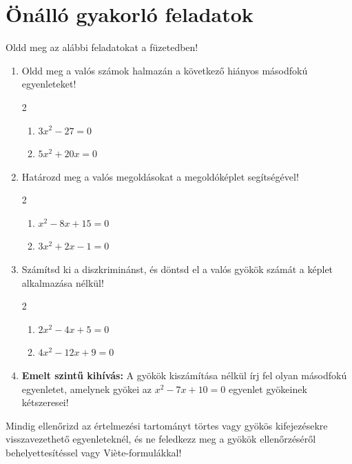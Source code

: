 \documentclass[11pt,a4paper]{article}
\begin{document}
\section{Önálló gyakorló feladatok}

Oldd meg az alábbi feladatokat a füzetedben!

\begin{enumerate}[label=\textbf{\arabic*.}]
    \item Oldd meg a valós számok halmazán a következő hiányos másodfokú egyenleteket!
    \begin{multicols}{2}
        \begin{enumerate}[label=\alph*)]
            \item $3x^2 - 27 = 0$
            \item $5x^2 + 20x = 0$
        \end{enumerate}
    \end{multicols}

    \item Határozd meg a valós megoldásokat a megoldóképlet segítségével!
    \begin{multicols}{2}
        \begin{enumerate}[label=\alph*)]
            \item $x^2 - 8x + 15 = 0$
            \item $3x^2 + 2x - 1 = 0$
        \end{enumerate}
    \end{multicols}

    \item Számítsd ki a diszkriminánst, és döntsd el a valós gyökök számát a képlet alkalmazása nélkül!
    \begin{multicols}{2}
        \begin{enumerate}[label=\alph*)]
            \item $2x^2 - 4x + 5 = 0$
            \item $4x^2 - 12x + 9 = 0$
        \end{enumerate}
    \end{multicols}

    \item \textbf{Emelt szintű kihívás:} A gyökök kiszámítása nélkül írj fel olyan másodfokú egyenletet, amelynek gyökei az $x^2 - 7x + 10 = 0$ egyenlet gyökeinek kétszeresei!
\end{enumerate}

\begin{fontosbox}
Mindig ellenőrizd az értelmezési tartományt törtes vagy gyökös kifejezésekre visszavezethető egyenleteknél, és ne feledkezz meg a gyökök ellenőrzéséről behelyettesítéssel vagy Viète-formulákkal!
\end{fontosbox}
\end{document}
